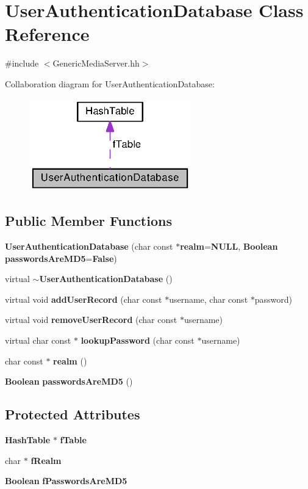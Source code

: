 \section{User\+Authentication\+Database Class Reference}
\label{classUserAuthenticationDatabase}


{\ttfamily \#include $<$Generic\+Media\+Server.\+hh$>$}



Collaboration diagram for User\+Authentication\+Database\+:
\nopagebreak
\begin{figure}[H]
\begin{center}
\leavevmode
\includegraphics[width=199pt]{classUserAuthenticationDatabase__coll__graph}
\end{center}
\end{figure}
\subsection*{Public Member Functions}
\begin{DoxyCompactItemize}
\item 
{\bf User\+Authentication\+Database} (char const $\ast${\bf realm}={\bf N\+U\+L\+L}, {\bf Boolean} {\bf passwords\+Are\+M\+D5}={\bf False})
\item 
virtual {\bf $\sim$\+User\+Authentication\+Database} ()
\item 
virtual void {\bf add\+User\+Record} (char const $\ast$username, char const $\ast$password)
\item 
virtual void {\bf remove\+User\+Record} (char const $\ast$username)
\item 
virtual char const $\ast$ {\bf lookup\+Password} (char const $\ast$username)
\item 
char const $\ast$ {\bf realm} ()
\item 
{\bf Boolean} {\bf passwords\+Are\+M\+D5} ()
\end{DoxyCompactItemize}
\subsection*{Protected Attributes}
\begin{DoxyCompactItemize}
\item 
{\bf Hash\+Table} $\ast$ {\bf f\+Table}
\item 
char $\ast$ {\bf f\+Realm}
\item 
{\bf Boolean} {\bf f\+Passwords\+Are\+M\+D5}
\end{DoxyCompactItemize}


